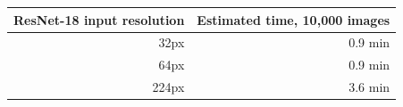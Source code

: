 \begin{tabular}{rr}
\toprule
ResNet-18 input resolution & Estimated time, 10{,}000 images \\
\midrule
32px & 0.9 min \\
64px & 0.9 min \\
224px & 3.6 min \\
\bottomrule
\end{tabular}
